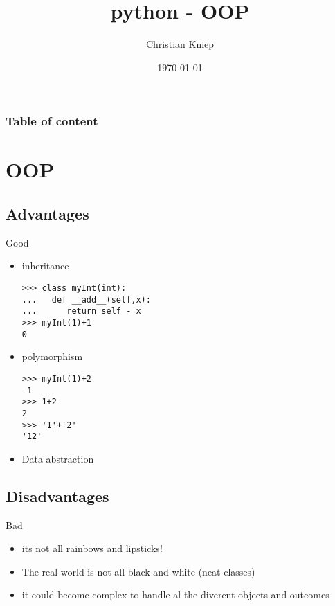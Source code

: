 \documentclass[hyperref={pdfpagelabels=false}]{beamer}
\author{Christian Kniep}
\begin{document}
\title{python - OOP}  
\date[\today]{\today} 

\begin{frame}
	\titlepage
\end{frame} 

\begin{frame}
	\frametitle{Table of content}
	\tableofcontents
\end{frame} 


\section{OOP} 
	\subsection{Advantages}
		\begin{frame}[fragile]{Good}
			\begin{itemize}
				\item<1-> inheritance
                \begin{lstlisting}
>>> class myInt(int):
...   def __add__(self,x):
...      return self - x
>>> myInt(1)+1
0
\end{lstlisting}
                \item<2-> polymorphism
                \begin{lstlisting}
>>> myInt(1)+2
-1
>>> 1+2
2
>>> '1'+'2'
'12'
\end{lstlisting}
            \item<3-> Data abstraction
            \end{itemize}
		\end{frame}
	\subsection{Disadvantages}
		\begin{frame}{Bad}
			\begin{itemize}
				\item<1-> its not all rainbows and lipsticks!
                \item<1-> The real world is not all black and white (neat classes)
                \item<2-> it could become complex to handle al the diverent objects and outcomes
            \end{itemize}
		\end{frame}
\end{document}
